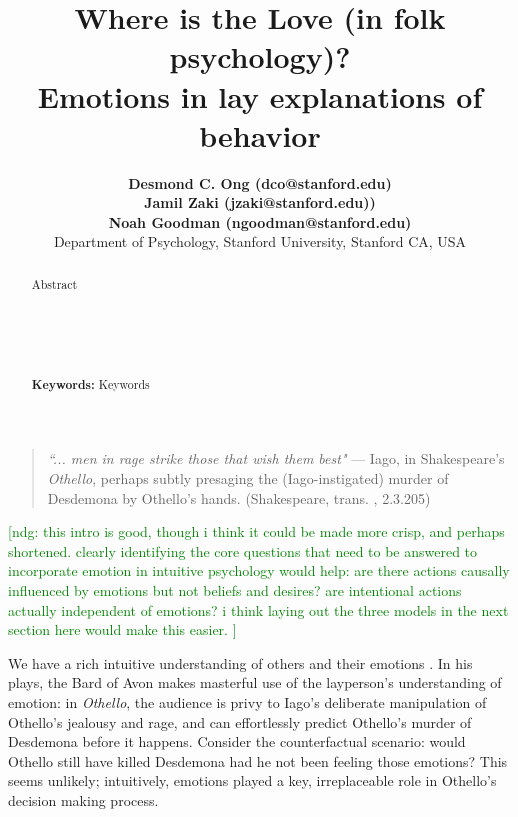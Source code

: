 \documentclass[10pt,letterpaper]{article}
\title{ Where is the Love (in folk psychology)? \\ Emotions in lay explanations of behavior \ndg{the cute part is a stretch... how about just the second part?}}
\author{{\large \bf Desmond C. Ong (dco@stanford.edu)} \\
{\large \bf Jamil Zaki (jzaki@stanford.edu))} \\
{\large \bf Noah Goodman (ngoodman@stanford.edu)} \\
  Department of Psychology, Stanford University, Stanford CA, USA 
}
\newcommand{\red}[1]{\textcolor{Red}{#1}}
\newcommand{\ndg}[1]{\textcolor{Green}{[ndg: #1]}}
\begin{document}
\maketitle

\begin{abstract}
Abstract \\
\\
\\
\\
\\
\\


\textbf{Keywords:} 
Keywords
\end{abstract}








\begin{quote}
\textit{``... men in rage strike those that wish them best"} 
--- Iago, in Shakespeare's \textit{Othello}, perhaps subtly presaging the (Iago-instigated) murder of Desdemona by Othello's hands. (Shakespeare, trans. , 2.3.205) %
\end{quote}



\ndg{this intro is good, though i think it could be made more crisp, and perhaps shortened. clearly identifying the core questions that need to be answered to incorporate emotion in intuitive psychology would help: are there actions causally influenced by emotions but not beliefs and desires? are intentional actions actually independent of emotions? i think laying out the three models in the next section here would make this easier. }

We have a rich intuitive understanding of others and their emotions \cite{Ong2015AffCog}. In his plays, the Bard of Avon makes masterful use of the layperson's understanding of emotion: in \textit{Othello}, the audience is privy to Iago's deliberate manipulation of Othello's jealousy and rage, and can effortlessly predict Othello's murder of Desdemona before it happens. Consider the counterfactual scenario: would Othello still have killed Desdemona had he not been feeling those emotions? This seems unlikely; intuitively, emotions played a key, irreplaceable role in Othello's decision making process.
\end{document}
